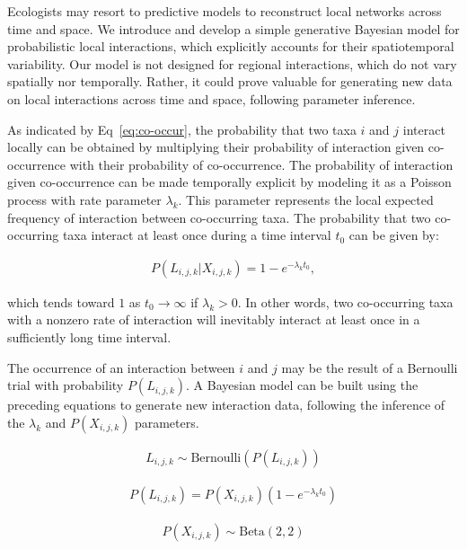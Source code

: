 \begin{box2.1}

Ecologists may resort to predictive models to reconstruct local networks
across time and space. We introduce and develop a simple generative Bayesian
model for probabilistic local interactions, which explicitly accounts for
their spatiotemporal variability. Our model is not designed for regional
interactions, which do not vary spatially nor temporally. Rather, it could
prove valuable for generating new data on local interactions across time and
space, following parameter inference. 

As indicated by Eq~\ref{eq:co-occur}, the probability that two taxa $i$ and $j$
interact locally can be obtained by multiplying their probability of interaction
given co-occurrence with their probability of co-occurrence. The probability of
interaction given co-occurrence can be made temporally explicit by modeling it
as a Poisson process with rate parameter $\lambda_k$. This parameter represents
the local expected frequency of interaction between co-occurring taxa. The
probability that two co-occurring taxa interact at least once during a time
interval $t_0$ can be given by:

\begin{eqnarray}
  \label{eq:modelrate}
  P(L_{i, j, k} | X_{i,j,k}) = 1-e^{-\lambda_k t_0},
\end{eqnarray}

which tends toward $1$ as $t_0 \to \infty$ if $\lambda_k > 0$. In other words,
two co-occurring taxa with a nonzero rate of interaction will inevitably
interact at least once in a sufficiently long time interval. 

The occurrence of an interaction between $i$ and $j$ may be the result of a
Bernoulli trial with probability $P(L_{i, j, k})$. A Bayesian model can be
built using the preceding equations to generate new interaction data,
following the inference of the $\lambda_k$ and $P(X_{i,j,k})$ parameters.

\begin{eqnarray}
  \label{eq:model}
  L_{i, j, k} \sim \text{Bernoulli}(P(L_{i, j, k}))
\end{eqnarray}

\begin{eqnarray}
  \label{eq:modeleq}
  P(L_{i, j, k}) = P(X_{i,j,k})(1-e^{-\lambda_k t_0})
\end{eqnarray}

\begin{eqnarray}
  \label{eq:modelgamma}
  P(X_{i,j,k}) \sim \text{Beta}(2,2)
\end{eqnarray}


\end{box2.1}
